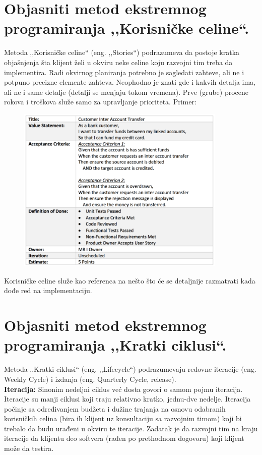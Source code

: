 \documentclass[a4paper]{article}
\begin{document}
\section{Objasniti metod ekstremnog programiranja ,,Korisničke celine``.}
  Metoda ,,Korisničke celine`` (eng. ,,Stories``) podrazumeva da postoje kratka objašnjenja
  šta klijent želi u okviru neke celine koju razvojni tim treba da implementira. Radi okvirnog
  planiranja potrebno je sagledati zahteve, ali ne i potpuno precizne elemente zahteva. Neophodno
  je znati gde i kakvih detalja ima, ali ne i same detalje (detalji se menjaju tokom vremena). 
  Prve (grube) procene rokova i troškova služe samo za upravljanje prioriteta. Primer:
  \begin{figure}[H]
    \begin{center}
        \includegraphics[width=100mm,height=80mm]{Slike/korisnicka_prica.png}
    \end{center}
  \end{figure} 

  Korisničke celine služe kao referenca na nešto što će se detaljnije razmatrati kada dođe red
  na implementaciju. 

\section{Objasniti metod ekstremnog programiranja ,,Kratki ciklusi``.}
  Metoda ,,Kratki ciklusi`` (eng. ,,Lifecycle``) podrazumevaju redovne iteracije (eng. Weekly Cycle) i 
  izdanja (eng. Quarterly Cycle, release).\\
  
  \textbf{Iteracija:} Sinonim nedeljni ciklus već dosta govori o samom pojmu iteracija.
  Iteracije su manji ciklusi koji traju relativno kratko, jednu-dve nedelje. 
  Iteracija počinje sa određivanjem budžeta i dužine trajanja na osnovu odabranih
  korisničkih celina (bira ih klijent uz konsultaciju sa razvojnim timom) koji bi trebalo 
  da budu urađeni u okviru te iteracije. Zadatak je da razvojni tim na kraju iteracije
  da klijentu deo softvera (rađen po prethodnom dogovoru) koji klijent može da testira.
\end{document}
